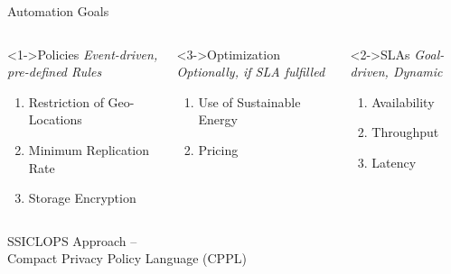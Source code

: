 \documentclass{beamer}
\begin{document}
\begin{frame}{Automation Goals}
\begin{columns}	
	\begin{block}<1->{Policies}
		\emph{Event-driven, pre-defined Rules}
		\begin{enumerate}
			\item Restriction of Geo-Locations
			\item Minimum Replication Rate
			\item Storage Encryption
		\end{enumerate}	
	\end{block}
\vspace{1cm}
\begin{block}<3->{Optimization}
	\emph{Optionally, if SLA fulfilled}
	\begin{enumerate}
		\item Use of Sustainable Energy
		\item Pricing
	\end{enumerate}	
\end{block}
\begin{block}<2->{SLAs}
\emph{Goal-driven, Dynamic}
\begin{enumerate}
	\item Availability
	\item Throughput
	\item Latency
\end{enumerate}
\end{block}	
\end{columns}
\end{frame}

	

\begin{frame}{SSICLOPS Approach –\\Compact Privacy Policy Language (CPPL) }
\vspace{0.5cm}
\begin{figure}
	\centering
		\def\svgwidth{0.95\textwidth}
	{\tiny \textsf{
			}
	\caption{\cite{ssiclops:d22:intercloud-policies}}}
\end{figure}
\end{frame}
\end{document}
